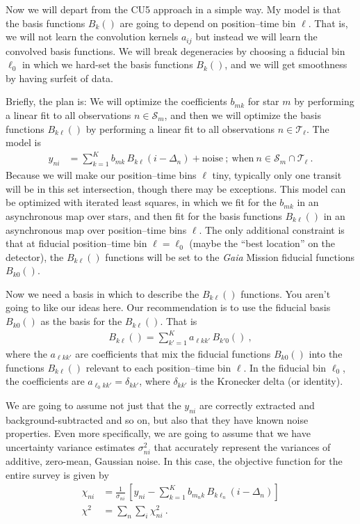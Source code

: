 \documentclass{article}
\newcommand{\set}[1]{\mathscr{#1}}
\begin{document}
Now we will depart from the CU5 approach in a simple way.
My model is that the basis functions $B_k()$ are going to depend on position--time bin $\ell$.
That is, we will not learn the convolution kernels $a_{ij}$ but instead we will learn the convolved basis functions.
We will break degeneracies by choosing a fiducial bin $\ell_0$ in which we hard-set the basis functions $B_k()$, and we will get smoothness by having surfeit of data.

Briefly, the plan is: We will optimize the coefficients $b_{mk}$ for star $m$ by performing a linear fit to all observations $n\in\set{S}_m$, and then we will optimize the basis functions $B_{k\ell}()$ by performing a linear fit to all observations $n\in\set{T}_\ell$.
The model is
\begin{align}
    y_{ni} &= \sum_{k=1}^K b_{mk}\,B_{k\ell}(i-\Delta_n)+\text{noise} ~;~ \text{when} ~ n\in\set{S}_m\cap\set{T}_\ell ~.
\end{align}
Because we will make our position--time bins $\ell$ tiny, typically only one transit will be in this set intersection, though there may be exceptions.
This model can be optimized with iterated least squares, in which we fit for the $b_{mk}$ in an asynchronous map over stars, and then fit for the basis functions $B_{k\ell}()$ in an asynchronous map over position--time bins $\ell$.
The only additional constraint is that at fiducial position--time bin $\ell=\ell_0$ (maybe the ``best location'' on the detector), the $B_{k\ell}()$ functions will be set to the \textsl{Gaia} Mission fiducial functions $B_{k0}()$.

Now we need a basis in which to describe the $B_{k\ell}()$ functions.
You aren't going to like our ideas here.
Our recommendation is to use the fiducial basis $B_{k0}()$ as the basis for the $B_{k\ell}()$.
That is
\begin{align}
    B_{k\ell}() = \sum_{k'=1}^{K} a_{\ell kk'}\,B_{k'0}() ~,
\end{align}
where the $a_{\ell kk'}$ are coefficients that mix the fiducial functions $B_{k0}()$ into the functions $B_{k\ell}()$ relevant to each position--time bin $\ell$.
In the fiducial bin $\ell_0$, the coefficients are $a_{\ell_0 kk'} = \delta_{kk'}$, where $\delta_{kk'}$ is the Kronecker delta (or identity).

We are going to assume not just that the $y_{ni}$ are correctly extracted and background-subtracted and so on, but also that they have known noise properties.
Even more specifically, we are going to assume that we have uncertainty variance estimates $\sigma^2_{ni}$ that accurately represent the variances of additive, zero-mean, Gaussian noise.
In this case, the objective function for the entire survey is given by
\begin{align}
    \chi_{ni} &= \frac{1}{\sigma_{ni}}\,\left[y_{ni} - \sum_{k=1}^K b_{m_nk}\,B_{k\ell_n}(i-\Delta_n)\right] \\
    \chi^2 &= \sum_n\sum_i \chi_{ni}^2 ~.
\end{align}
\end{document}
